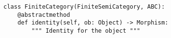 \begin{verbatim}
class FiniteCategory(FiniteSemiCategory, ABC):
    @abstractmethod
    def identity(self, ob: Object) -> Morphism:
        """ Identity for the object """
\end{verbatim}